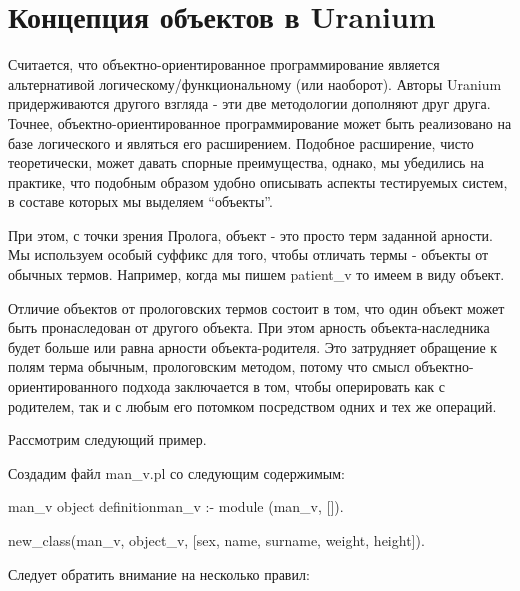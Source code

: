 \documentclass[a4paper]{book}
\def\ur{Uranium}
\begin{document}
\section{Концепция объектов в \ur}
Считается, что объектно-ориентированное программирование является
альтернативой логическому/функциональному (или наоборот). Авторы
\ur{} придерживаются другого взгляда - эти две методологии
дополняют друг друга. Точнее, объектно-ориентированное
программирование может быть реализовано на базе логического и
являться его расширением. Подобное расширение, чисто
теоретически, может давать спорные преимущества, однако, мы
убедились на практике, что подобным образом удобно описывать
аспекты тестируемых систем, в составе которых мы выделяем
``объекты''. 

При этом, с точки зрения Пролога, объект - это просто терм
заданной арности. Мы используем особый суффикс для того, чтобы
отличать термы - объекты от обычных термов. Например, когда мы
пишем patient\_v то имеем в виду объект. 

Отличие объектов от прологовских термов состоит в том, что один
объект может быть пронаследован от другого объекта. При этом
арность объекта-наследника будет больше или равна арности
объекта-родителя. Это затрудняет обращение к полям терма обычным,
прологовским методом, потому что смысл объектно-ориентированного
подхода заключается в том, чтобы оперировать как с родителем, так
и с любым его потомком посредством одних и тех же операций.

Рассмотрим следующий пример.

Создадим файл man\_v.pl со следующим содержимым:

\begin{example}{man\_v object definition}{man_v}
:- module (man_v, []).

new_class(man_v, object_v, [sex, name, surname, weight, height]).
\end{example}

Следует обратить внимание на несколько правил:
\end{document}
